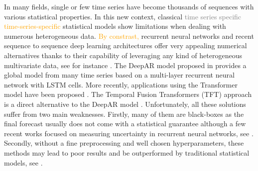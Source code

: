 \documentclass[10pt]{article} %
\begin{document}
In many fields, single or few time series have become thousands of sequences with various statistical properties. In this new context, classical \textcolor{gray}{time series specific} \textcolor{orange}{time-series-specific} statistical models show limitations when dealing with numerous heterogeneous data. \textcolor{orange}{By constrast,} recurrent neural networks and recent sequence to sequence deep learning architectures offer very appealing numerical alternatives thanks to their capability of leveraging any kind of heterogeneous multivariate data, see for instance \citet{ hochreiter1997,vaswani2017, siami2018, li2019, lim2019,salinas2020}. The DeepAR model proposed in \citet{salinas2020} provides a global model from many time series based on a multi-layer recurrent neural network with LSTM cells. More recently, applications using the Transformer model have been proposed  \citep{li2019}. The Temporal Fusion Transformers (TFT) approach is a direct alternative to the DeepAR model \citep{lim2019}.  Unfortunately, all these solutions suffer from two main weaknesses. Firstly, many of them are black-boxes  as the final forecast usually does not come with a statistical guarantee  although a few recent works focused on measuring uncertainty in recurrent neural networks, see  \citet{martin2020}. Secondly, without a fine preprocessing and well chosen hyperparameters, these methods may lead to poor results and be outperformed by traditional statistical models, see \citet{makridakis2018}.
\end{document}
